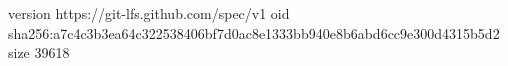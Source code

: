 version https://git-lfs.github.com/spec/v1
oid sha256:a7c4c3b3ea64c322538406bf7d0ac8e1333bb940e8b6abd6cc9e300d4315b5d2
size 39618
